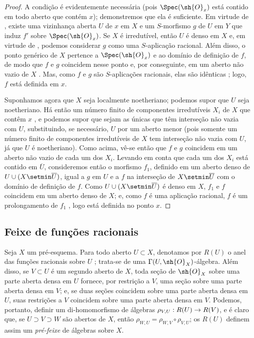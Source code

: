 \documentclass[oneside]{amsart}
\makeatletter
\newcommand{\ega@arrow}[2]{\mathchoice{#1}{#2}{#2}{#2}}
\renewcommand{\to}{\ega@arrow{\longrightarrow}{\rightarrow}}
\let\EGAOriginalLabel\label
\renewcommand{\label}[1]{\phantomsection\EGAOriginalLabel{#1}}
\makeatother
\begin{document}
\begin{proof}
A condição é evidentemente necessária (pois $\Spec(\sh{O}_x)$ está contido em todo aberto que contém $x$); demonstremos que ela é suficiente.
Em virtude de , existe uma vizinhança aberta $U$ de $x$ em $X$ e um $S$-morfismo $g$ de $U$ em $Y$ que induz $f'$ sobre $\Spec(\sh{O}_x)$.
Se $X$ é irredutível, então $U$ é denso em $X$ e, em virtude de , podemos considerar $g$ como uma $S$-aplicação racional.
Além disso, o ponto genérico de $X$ pertence a $\Spec(\sh{O}_x)$ e ao domínio de definição de $f$, de modo que $f$ e $g$ coincidem nesse ponto e, por conseguinte, em um aberto não vazio de $X$ .
Mas, como $f$ e $g$ são $S$-aplicações racionais, elas são idênticas ; logo, $f$ está definida em $x$.

Suponhamos agora que $X$ seja localmente noetheriano; podemos supor que $U$ seja noetheriano.
Há então um número finito de componentes irredutíveis $X_i$ de $X$ que contêm $x$ , e podemos supor que sejam as únicas que têm interseção não vazia com $U$, substituindo, se necessário, $U$ por um aberto menor (pois somente um número finito de componentes irredutíveis de $X$ tem interseção não vazia com $U$, já que $U$ é noetheriano).
Como acima, vê-se então que $f$ e $g$ coincidem em um aberto não vazio de cada um dos $X_i$.
Levando em conta que cada um dos $X_i$ está contido em $\overline{U}$, consideremos então o morfismo $f_1$, definido em um aberto denso de $U\cup(X\setmin\overline{U})$, igual a $g$ em $U$ e a $f$ na interseção de $X\setmin\overline{U}$ com o domínio de definição de $f$.
Como $U\cup(X\setmin\overline{U})$ é denso em $X$, $f_1$ e $f$ coincidem em um aberto denso de $X$; e, como $f$ é uma aplicação racional, $f$ é um prolongamento de $f_1$ , logo está definida no ponto $x$.
\end{proof}

\subsection{Feixe de funções racionais}
\label{subsection:I.7.3}

\begin{env}[7.3.1]
\label{I.7.3.1}
Seja $X$ um pré-esquema.
Para todo aberto $U\subset X$, denotamos por $R(U)$ o anel das funções racionais sobre $U$ ; trata-se de uma $\Gamma(U,\sh{O}_X)$-álgebra.
Além disso, se $V\subset U$ é um segundo aberto de $X$, toda seção de $\sh{O}_X$ sobre uma parte aberta densa em $U$ fornece, por restrição a $V$, uma seção sobre uma parte aberta densa em $V$; e, se duas seções coincidem sobre uma parte aberta densa em $U$, suas restrições a $V$ coincidem sobre uma parte aberta densa em $V$.
Podemos, portanto, definir um di-homomorfismo de álgebras $\rho_{V,U}:R(U)\to R(V)$, e é claro que, se $U\supset V\supset W$ são abertos de $X$, então $\rho_{W,U}=\rho_{W,V}\circ\rho_{V,U}$; os $R(U)$ definem assim um \emph{pré-feixe} de álgebras sobre $X$.
\end{env}
\end{document}
